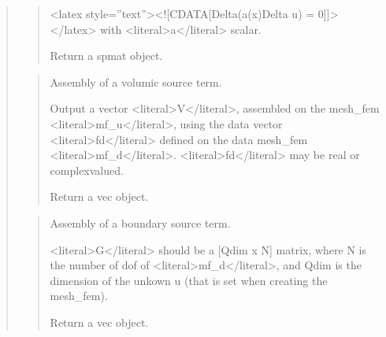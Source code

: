 \documentclass[a4paper,11pt,english]{sphinxmanual}
\begin{document}
\begin{quote}
\begin{quote}
\sphinxAtStartPar
\textless{}latex style=”text”\textgreater{}\textless{}!{[}CDATA{[}Delta(a(x)Delta u) = 0{]}{]}\textgreater{}\textless{}/latex\textgreater{}   with \textless{}literal\textgreater{}a\textless{}/literal\textgreater{} scalar.

\sphinxAtStartPar
Return a spmat object.
\end{quote}

\sphinxAtStartPar
{}
\begin{quote}

\sphinxAtStartPar
Assembly of a volumic source term.

\sphinxAtStartPar
Output a vector \textless{}literal\textgreater{}V\textless{}/literal\textgreater{}, assembled on the mesh\_fem \textless{}literal\textgreater{}mf\_u\textless{}/literal\textgreater{}, using the data
vector \textless{}literal\textgreater{}fd\textless{}/literal\textgreater{} defined on the data mesh\_fem \textless{}literal\textgreater{}mf\_d\textless{}/literal\textgreater{}. \textless{}literal\textgreater{}fd\textless{}/literal\textgreater{} may be real or
complex\sphinxhyphen{}valued.

\sphinxAtStartPar
Return a vec object.
\end{quote}

\sphinxAtStartPar
{}
\begin{quote}

\sphinxAtStartPar
Assembly of a boundary source term.

\sphinxAtStartPar
\textless{}literal\textgreater{}G\textless{}/literal\textgreater{} should be a {[}Qdim x N{]} matrix, where N is the number of dof
of \textless{}literal\textgreater{}mf\_d\textless{}/literal\textgreater{}, and Qdim is the dimension of the unkown u (that is set
when creating the mesh\_fem).

\sphinxAtStartPar
Return a vec object.
\end{quote}

\sphinxAtStartPar
{}
\begin{quote}


\end{quote}
\end{quote}
\end{document}
